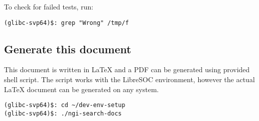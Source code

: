 To check for failed tests, run:

\begin{verbatim}
(glibc-svp64)$: grep "Wrong" /tmp/f
\end{verbatim}

\subsection{Generate this document}

This document is written in \LaTeX{} and a PDF can be generated using provided
shell script. The script works with the LibreSOC environment, however the
actual \LaTeX{} document can be generated on any system.

\begin{verbatim}
(glibc-svp64)$: cd ~/dev-env-setup
(glibc-svp64)$: ./ngi-search-docs
\end{verbatim}